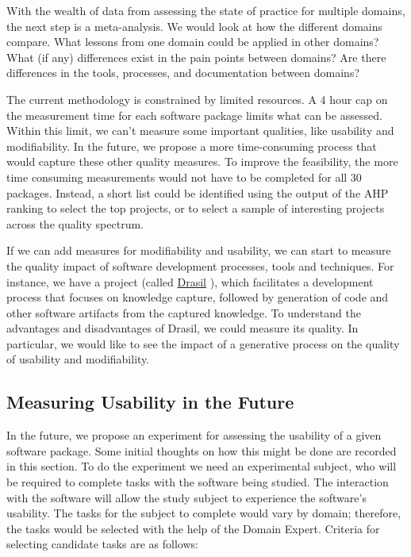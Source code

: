 \documentclass[letterpaper,cleveref]{lipics-v2019}
\begin{document}
With the wealth of data from assessing the state of practice for multiple
domains, the next step is a meta-analysis.  We would look at how the different
domains compare. What lessons from one domain could be applied in other domains?
What (if any) differences exist in the pain points between domains?  Are there
differences in the tools, processes, and documentation between domains?

The current methodology is constrained by limited resources.  A 4 hour cap on
the measurement time for each software package limits what can be assessed.
Within this limit, we can't measure some important qualities, like usability and
modifiability.  In the future, we propose a more time-consuming process that
would capture these other quality measures.  To improve the feasibility, the
more time consuming measurements would not have to be completed for all 30
packages. Instead, a short list could be identified using the output of the AHP
ranking to select the top projects, or to select a sample of interesting
projects across the quality spectrum.

If we can add measures for modifiability and usability, we can start to measure
the quality impact of software development processes, tools and techniques.  For
instance, we have a project (called
\href{https://github.com/JacquesCarette/Drasil} {Drasil}
\citep{SzymczakEtAl2016}), which facilitates a development process that focuses
on knowledge capture, followed by generation of code and other software
artifacts from the captured knowledge.  To understand the advantages and
disadvantages of Drasil, we could measure its quality.  In particular, we would
like to see the impact of a generative process on the quality of usability and
modifiability.

\subsection{Measuring Usability in the Future}

In the future, we propose an experiment for assessing the usability of a given
software package.  Some initial thoughts on how this might be done are recorded
in this section.  To do the experiment we need an experimental subject, who will
be required to complete tasks with the software being studied.  The interaction
with the software will allow the study subject to experience the software's
usability.  The tasks for the subject to complete would vary by domain;
therefore, the tasks would be selected with the help of the Domain Expert.
Criteria for selecting candidate tasks are as follows:
\end{document}
